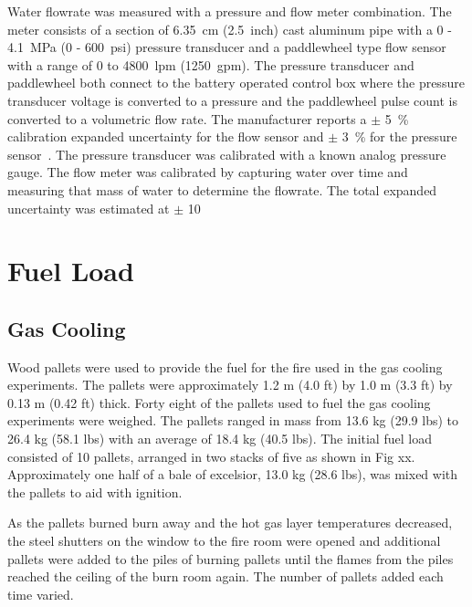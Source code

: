 \documentclass[12pt,oneside]{book}
\begin{document}
Water flowrate was measured with a pressure and flow meter combination. The meter consists of a section of 6.35~cm (2.5~inch) cast aluminum pipe with a 0 - 4.1~MPa (0 - 600~psi) pressure transducer and a paddlewheel type flow sensor with a range of 0 to 4800~lpm (1250~gpm). The pressure transducer and paddlewheel both connect to the battery operated control box where the pressure transducer voltage is converted to a pressure and the paddlewheel pulse count is converted to a volumetric flow rate.  The manufacturer reports a $\pm$ 5~\% calibration expanded uncertainty for the flow sensor and $\pm$ 3~\%  for the pressure sensor~\cite{Akron:2009}. The pressure transducer was calibrated with a known analog pressure gauge. The flow meter was calibrated by capturing water over time and measuring that mass of water to determine the flowrate. The total expanded uncertainty was estimated at $\pm$ 10 %

\section{Fuel Load}
\label{sec:fuel_load}

\subsection{Gas Cooling}
\label{sec:Fuel_Load_Gas_Cooling}

Wood pallets were used to provide the fuel for the fire used in the gas cooling experiments.  The pallets were approximately   1.2 m (4.0 ft) by 1.0 m (3.3 ft) by 0.13 m (0.42 ft) thick.  Forty eight of the pallets used to fuel the gas cooling experiments were weighed.  The pallets ranged in mass from 13.6 kg (29.9 lbs) to 26.4 kg (58.1 lbs) with an average of 18.4 kg (40.5 lbs).  The initial fuel load consisted of 10 pallets, arranged in two stacks of five as shown in Fig xx.  Approximately one half of a bale of excelsior, 13.0  kg (28.6 lbs), was mixed with the pallets to aid with ignition.

As the pallets burned burn away and the hot gas layer temperatures decreased, the steel shutters on the window to the fire room were opened and additional pallets were added to the piles of burning pallets until the flames from the piles reached the ceiling of the burn room again.  The number of pallets added each time varied.
\end{document}
